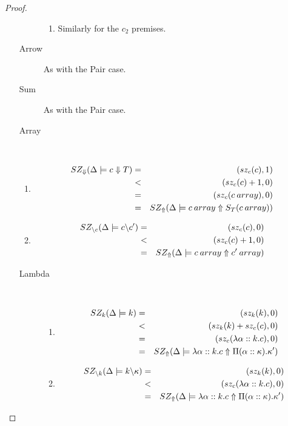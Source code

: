 \documentclass[12pt,twoside,fleqn]{amsart}
\theoremstyle{plain}
\theoremstyle{plain}
\theoremstyle{definition}
\begin{document}
\begin{proof}
\begin{itemize}
\begin{description}
\begin{enumerate}
\item Similarly for the \( c_{2} \) premises.
\end{enumerate}
\item [Arrow]As with the Pair case.
\item [Sum]As with the Pair case.
\item [Array]~
\end{description}
\begin{enumerate}
\item 
\begin{eqnarray*}
SZ_{\Downarrow }(\Delta  \models c \Downarrow T ) & = & (sz_{c}(c ),1)\\
 & < & (sz_{c}(c )+1,0)\\
 & = & (sz_{c}(c \: array ),0)\\
 & = & SZ_{\Uparrow }(\Delta  \models c \: array \Uparrow S_{T}(c \: array ) )
\end{eqnarray*}

\item 
\begin{eqnarray*}
SZ_{\backslash c}(\Delta   \models c  \backslash c'  ) & = & (sz_{c}(c ),0)\\
 & < & (sz_{c}(c )+1,0)\\
 & = & SZ_{\Uparrow }(\Delta   \models c \: array  \Uparrow c' \: array  )
\end{eqnarray*}

\end{enumerate}
\begin{description}
\item [Lambda]~

\begin{enumerate}
\item 
\begin{eqnarray*}
SZ_k(\Delta  \models k) & = & (sz_k(k),0)\\
 & < & (sz_k(k)+sz_{c}(c ),0)\\
 & = & (sz_{c}(\lambda \alpha  ::k .c ),0)\\
 & = & SZ_{\Uparrow }(\Delta  \models \lambda \alpha  ::k .c \Uparrow \Pi (\alpha ::\kappa ).\kappa ' )
\end{eqnarray*}

\item 
\begin{eqnarray*}
SZ_{\backslash k}(\Delta   \models k  \backslash \kappa   ) & = & (sz_k(k),0)\\
 & < & (sz_{c}(\lambda \alpha  ::k .c ),0)\\
 & = & SZ_{\Uparrow }(\Delta  \models \lambda \alpha  ::k .c \Uparrow \Pi (\alpha ::\kappa ).\kappa ' )
\end{eqnarray*}


\end{enumerate}
\end{description}
\end{itemize}
\end{proof}
\end{document}
